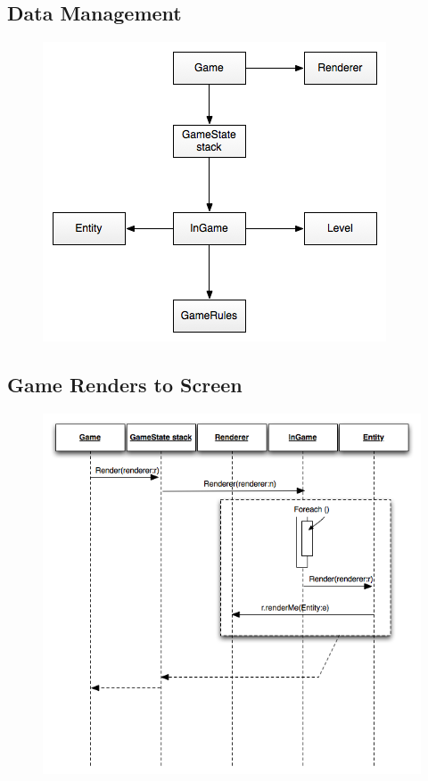 \subsection{Data Management}
\begin{figure}[H]
	\begin{center}
		\includegraphics[scale=0.75]{graphics/DataManagementView}
	\end{center}
\end{figure}

\subsection{Game Renders to Screen}
\begin{figure}[H]
	\begin{center}
		\includegraphics[scale=0.75]{graphics/GameRendersToScreen}
	\end{center}
\end{figure}

